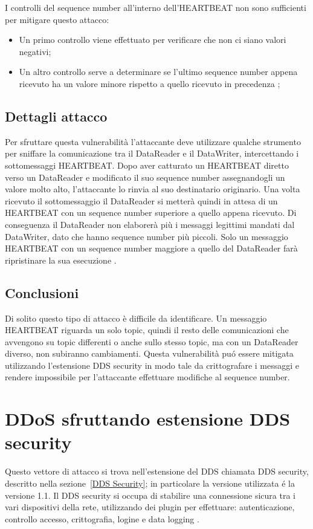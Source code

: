 I controlli del sequence number all'interno dell'HEARTBEAT 
non sono sufficienti per mitigare questo attacco:
\begin{itemize}
    \item Un primo controllo viene effettuato per verificare che non ci siano 
    valori negativi;
    \item Un altro controllo serve a determinare se l'ultimo sequence number
    appena ricevuto ha un valore minore rispetto a quello ricevuto in precedenza
    \cite{White2017AnII};
\end{itemize}


\subsection{Dettagli attacco}

Per sfruttare questa vulnerabilità l'attaccante deve utilizzare qualche 
strumento per sniffare la comunicazione tra il DataReader e il DataWriter,
intercettando i
sottomessaggi HEARTBEAT. Dopo aver catturato un HEARTBEAT diretto verso 
un DataReader e modificato 
il suo sequence number assegnandogli un valore molto alto, 
l'attaccante lo rinvia al suo destinatario originario.
Una volta ricevuto il sottomessaggio il DataReader si metterà quindi 
in attesa di un HEARTBEAT con un sequence number 
superiore a quello appena ricevuto. Di conseguenza il DataReader
non elaborerà più i messaggi legittimi mandati dal DataWriter,
dato che hanno sequence number più piccoli.
Solo un messaggio HEARTBEAT con un sequence number
maggiore a quello del DataReader farà ripristinare la sua esecuzione 
\cite{White2017AnII}.


\subsection{Conclusioni}
Di solito questo tipo di attacco è difficile da identificare. 
Un messaggio HEARTBEAT riguarda un solo topic, quindi il resto delle
comunicazioni che avvengono su topic differenti o anche sullo stesso 
topic, ma con un DataReader diverso, non subiranno cambiamenti.
Questa vulnerabilità puó essere mitigata utilizzando l'estensione
DDS security in modo tale da crittografare i messaggi e rendere 
impossibile per l'attaccante effettuare modifiche al 
sequence number. 


\section{DDoS sfruttando estensione DDS security}
Questo vettore di attacco si trova nell'estensione del DDS chiamata
DDS security, descritto nella sezione~\ref{DDS Security}; 
in particolare la versione utilizzata é la versione 1.1.
Il DDS security si occupa di stabilire una
connessione sicura tra i vari dispositivi della rete, utilizzando 
dei plugin per effettuare: autenticazione, controllo accesso, crittografia,
logine e data logging \cite{ddssecurity1.1}.

